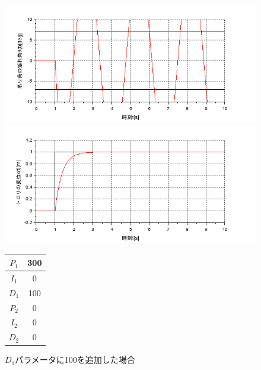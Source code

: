 \documentclass[dvipdfmx,titlepage,a4j]{jsarticle}  %
\begin{document}
\begin{figure}[H]
  \begin{minipage}{4.5cm}
    \centering
    \includegraphics[keepaspectratio, scale=0.35]{../graph/crane/ang-P1-300-I1-0-D1-100-P2-0-I2-0-D2-0.png}
  \end{minipage}
  \hfill
  \begin{minipage}{4.5cm}
    \centering
    \includegraphics[keepaspectratio, scale=0.35]{../graph/crane/po-P1-300-I1-0-D1-100-P2-0-I2-0-D2-0.png}
  \end{minipage}
  \hfill
  \begin{minipage}{3cm}
    \begin{center}
      \begin{tabular}{c|c}
        \hline
        $P_1$ & 300\\ \hline
        $I_1$ & 0\\ \hline
        $D_1$ & 100\\ \hline
        $P_2$ & 0\\ \hline
        $I_2$ & 0\\ \hline
        $D_2$ & 0\\
        \hline
      \end{tabular}
    \end{center}
  \end{minipage}
  \hfill
  \caption{$D_1$パラメータに100を追加した場合}
  \label{fig:crane:5}
\end{figure}
\end{document}
